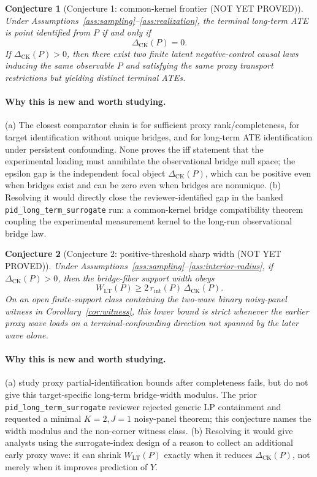 \documentclass[11pt]{article}
\theoremstyle{definition}
\theoremstyle{plain}
\newtheorem{conjecture}{Conjecture}
\theoremstyle{remark}
\begin{document}
\begin{conjecture}[Conjecture 1: common-kernel frontier (NOT YET PROVED)]\label{conj:ck-frontier}
Under Assumptions~\ref{ass:sampling}--\ref{ass:realization}, the terminal
long-term ATE is point identified from \(P\) if and only if
\[
\Delta_{\mathrm{CK}}(P)=0.
\]
If \(\Delta_{\mathrm{CK}}(P)>0\), then there exist two finite latent
negative-control causal laws inducing the same observable \(P\) and satisfying
the same proxy transport restrictions but yielding distinct terminal ATEs.
\end{conjecture}
\paragraph{Why this is new and worth studying.}
(a) The closest comparator chain is
\citet{MiaoGengTchetgen2018} for sufficient proxy rank/completeness,
\citet{ZhangLiMiaoTchetgen2023} for target identification without unique
bridges, and \citet{ImbensKallusMaoWang2025} for long-term ATE identification
under persistent confounding.  None proves the iff statement that the
experimental loading must annihilate the observational bridge null space; the
epsilon gap is the independent focal object
\(\Delta_{\mathrm{CK}}(P)\), which can be positive even when bridges exist and
can be zero even when bridges are nonunique.  (b) Resolving it would directly
close the reviewer-identified gap in the banked
\texttt{pid\_long\_term\_surrogate} run: a common-kernel bridge compatibility
theorem coupling the experimental measurement kernel to the long-run
observational bridge law.

\begin{conjecture}[Conjecture 2: positive-threshold sharp width (NOT YET PROVED)]\label{conj:positive-width}
Under Assumptions~\ref{ass:sampling}--\ref{ass:interior-radius}, if
\(\Delta_{\mathrm{CK}}(P)>0\), then the bridge-fiber support width obeys
\[
W_{\mathrm{LT}}(P)\ge 2\,r_{\mathrm{int}}(P)\,\Delta_{\mathrm{CK}}(P).
\]
On an open finite-support class containing the two-wave binary noisy-panel
witness in Corollary~\ref{cor:witness}, this lower bound is strict whenever
the earlier proxy wave loads on a terminal-confounding direction not spanned by
the later wave alone.
\end{conjecture}
\paragraph{Why this is new and worth studying.}
(a) \citet{GhassamiShpitserTchetgen2023} study proxy partial-identification
bounds after completeness fails, but do not give this target-specific
long-term bridge-width modulus.  The prior
\texttt{pid\_long\_term\_surrogate} reviewer rejected generic LP containment
and requested a minimal \(K=2,J=1\) noisy-panel theorem; this conjecture names
the width modulus and the non-corner witness class.  (b) Resolving it would
give analysts using the surrogate-index design of
\citet{AtheyChettyImbensKang2019} a reason to collect an additional early
proxy wave: it can shrink \(W_{\mathrm{LT}}(P)\) exactly when it reduces
\(\Delta_{\mathrm{CK}}(P)\), not merely when it improves prediction of \(Y\).
\end{document}
